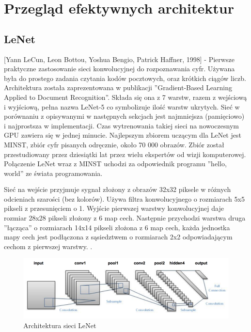 \documentclass[12pt,a4paper,twoside,titlepage,openright]{book}
\begin{document}
\section{Przegląd efektywnych architektur}

\subsection{LeNet}
[Yann LeCun, Leon Bottou, Yoshua Bengio, Patrick Haffner, 1998] - Pierwsze praktyczne zastosowanie sieci konwolucyjnej do rozpoznawania cyfr. Używana była do prostego zadania czytania kodów pocztowych, oraz krótkich ciągów liczb. Architektura została zaprezentowana w publikacji ''Gradient-Based Learning Applied to Document Recognition''. Składa się ona z 7 warstw, razem z wejściową i wyjściową, pełna nazwa LeNet-5 co symbolizuje ilość warstw ukrytych. Sieć w porównaniu z opisywanymi w następnych sekcjach jest najmniejsza (pamięciowo) i najprostsza w implementacji. Czas wytrenowania takiej sieci na nowoczesnym GPU zawiera się w jednej minucie. Najlepszym zbiorem uczącym dla LeNet jest MINST, zbiór cyfr pisanych odręcznie, około 70 000 obrazów. Zbiór został przestudiowany przez dziesiątki lat przez wielu ekspertów od wizji komputerowej. Połączenie LeNet wraz z MINST uchodzi za odpowiednik programu ''hello, world'' ze świata programowania. 

Sieć na wejście przyjmuje sygnał złożony z obrazów 32x32 piksele w różnych odcieniach szarości (bez kolorów). Używa filtra konwolucyjnego o rozmiarach 5x5 pikseli z przesunięciem o 1. Wyjście pierwszej warstwy konwolucyjnej daje rozmiar 28x28 pikseli złożony z 6 map cech. Następnie przychodzi warstwa druga ''łącząca'' o rozmiarach 14x14 pikseli złożona z 6 map cech, każda jednostka mapy cech jest podłączona z sąsiedztwem o rozmiarach 2x2 odpowiadającym cechom z pierwszej warstwy. . \cite{Lecun98gradient-basedlearning}

\begin{figure}[h]
	\centering
			\includegraphics[resolution=100, scale=0.6]{LeNet.png}
		\caption{Architektura sieci LeNet}
\end{figure}
\end{document}
